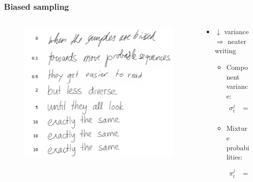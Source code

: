 \documentclass[10pt,xcolor=dvipsnames]{beamer}
\begin{document}
\begin{frame}
  \frametitle{Biased sampling}
\begin{columns}
  \begin{column}{.5\textwidth}
    \begin{figure}
      \centering
  \includegraphics[width=\linewidth]{fig/fig16.png}
      \label{fig:fig16}
    \end{figure}
  \end{column}

  \begin{column}{.5\textwidth}
    \begin{itemize}
    \item $\downarrow$ variance $\Rightarrow$ neater writing
      \begin{itemize}
      \item Component variance:
        \begin{align*}
          \sigma^j_t &= \exp(\hat{\sigma}^j_t - b)
        \end{align*}
      \item Mixture probabilities:
        \begin{align*}
          \pi^j_t &= \frac{\exp(\hat{\pi}_t^j(1+b))}{\sum_{j'}\exp(\hat{\pi}_t^{j'}(1+b))}
        \end{align*}
      \end{itemize}
    \end{itemize}
  \end{column}
\end{columns}
\end{frame}
\end{document}
